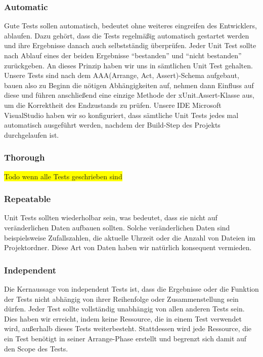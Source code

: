 \documentclass[
10pt, %
a4paper, %
oneside, %
headinclude,footinclude, %
BCOR5mm, %
]{scrartcl}
\begin{document}
\begin{onehalfspace}
\subsubsection{Automatic}
Gute Tests sollen automatisch, bedeutet ohne weiteres eingreifen des Entwicklers, ablaufen. Dazu gehört, dass die Tests regelmäßig automatisch gestartet werden und ihre Ergebnisse danach auch selbstständig überprüfen. Jeder Unit Test sollte nach Ablauf eines der beiden Ergebnisse \enquote{bestanden} und \enquote{nicht bestanden} zurückgeben.
An dieses Prinzip haben wir uns in sämtlichen Unit Test gehalten. Unsere Tests sind nach dem AAA(Arrange, Act, Assert)-Schema aufgebaut, bauen also zu Beginn die nötigen Abhängigkeiten auf, nehmen dann Einfluss auf diese und führen anschließend eine einzige Methode der xUnit.Assert-Klasse aus, um die Korrektheit des Endzustands zu prüfen. Unsere IDE Microsoft VisualStudio haben wir so konfiguriert, dass sämtliche Unit Tests jedes mal automatisch ausgeführt werden, nachdem der Build-Step des Projekts durchgelaufen ist.

\subsubsection{Thorough}
\colorbox{yellow}{Todo wenn alle Tests geschrieben sind}
\subsubsection{Repeatable}
Unit Tests sollten wiederholbar sein, was bedeutet, dass sie nicht auf veränderlichen Daten aufbauen sollten. Solche veränderlichen Daten sind beispielsweise Zufallszahlen, die aktuelle Uhrzeit oder die Anzahl von Dateien im Projektordner. Diese Art von Daten haben wir natürlich konsequent vermieden.
\subsubsection{Independent}
Die Kernaussage von independent Tests ist, dass die Ergebnisse oder die Funktion der Tests nicht abhängig von ihrer Reihenfolge oder Zusammenstellung sein dürfen. Jeder Test sollte vollständig unabhängig von allen anderen Tests sein. Dies haben wir erreicht, indem keine Ressource, die in einem Test verwendet wird, außerhalb dieses Tests weiterbesteht. Stattdessen wird jede Ressource, die ein Test benötigt in seiner Arrange-Phase erstellt und begrenzt sich damit auf den Scope des Tests.

\end{onehalfspace}
\end{document}
